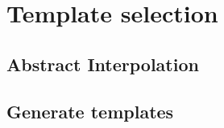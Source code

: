 
% 


\section{Template selection}


\subsection{Abstract Interpolation}

\subsection{Generate templates}


% 


